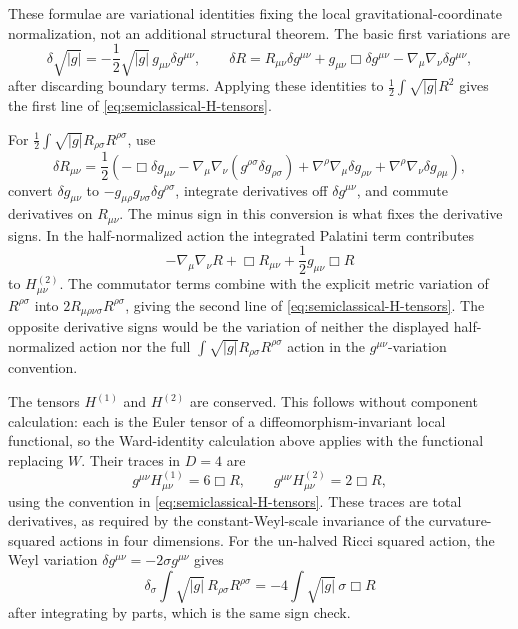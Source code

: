 These formulae are variational identities fixing the local
gravitational-coordinate normalization, not an additional structural theorem.
The basic first variations are
\begin{equation}
  \delta\sqrt{|g|}
  =
  -\frac12\sqrt{|g|}\,g_{\mu\nu}\delta g^{\mu\nu},
  \qquad
  \delta R
  =
  R_{\mu\nu}\delta g^{\mu\nu}
  +
  g_{\mu\nu}\Box\delta g^{\mu\nu}
  -
  \nabla_\mu\nabla_\nu\delta g^{\mu\nu},
  \label{eq:semiclassical-basic-metric-variations}
\end{equation}
after discarding boundary terms.  Applying these identities to
\(\frac12\int\sqrt{|g|}R^2\) gives the first line of
\eqref{eq:semiclassical-H-tensors}.

For \(\frac12\int\sqrt{|g|}R_{\rho\sigma}R^{\rho\sigma}\), use
\begin{equation}
  \delta R_{\mu\nu}
  =
  \frac12\left(
    -\Box\delta g_{\mu\nu}
    -\nabla_\mu\nabla_\nu(g^{\rho\sigma}\delta g_{\rho\sigma})
    +
    \nabla^\rho\nabla_\mu\delta g_{\rho\nu}
    +
    \nabla^\rho\nabla_\nu\delta g_{\rho\mu}
  \right),
  \label{eq:semiclassical-ricci-variation}
\end{equation}
convert \(\delta g_{\mu\nu}\) to
\(-g_{\mu\rho}g_{\nu\sigma}\delta g^{\rho\sigma}\), integrate derivatives
off \(\delta g^{\mu\nu}\), and commute derivatives on \(R_{\mu\nu}\).  The
minus sign in this conversion is what fixes the derivative signs.  In the
half-normalized action the integrated Palatini term contributes
\[
  -\nabla_\mu\nabla_\nu R+\Box R_{\mu\nu}
  +\frac12g_{\mu\nu}\Box R
\]
to \(H^{(2)}_{\mu\nu}\).  The commutator terms combine with the explicit
metric variation of \(R^{\rho\sigma}\) into
\(2R_{\mu\rho\nu\sigma}R^{\rho\sigma}\), giving the second line of
\eqref{eq:semiclassical-H-tensors}.  The opposite derivative signs would be
the variation of neither the displayed half-normalized action nor the
full \(\int\sqrt{|g|}R_{\rho\sigma}R^{\rho\sigma}\) action in the
\(g^{\mu\nu}\)-variation convention.

The tensors \(H^{(1)}\) and \(H^{(2)}\) are conserved.  This follows without
component calculation: each is the Euler tensor of a diffeomorphism-invariant
local functional, so the Ward-identity calculation above applies with the
functional replacing \(W\).  Their traces in \(D=4\) are
\begin{equation}
  g^{\mu\nu}H^{(1)}_{\mu\nu}=6\Box R,
  \qquad
  g^{\mu\nu}H^{(2)}_{\mu\nu}=2\Box R,
  \label{eq:semiclassical-H-traces}
\end{equation}
using the convention in \eqref{eq:semiclassical-H-tensors}.  These traces
are total derivatives, as required by the constant-Weyl-scale invariance of
the curvature-squared actions in four dimensions.  For the un-halved Ricci
squared action, the Weyl variation
\(\delta g^{\mu\nu}=-2\sigma g^{\mu\nu}\) gives
\[
  \delta_\sigma
  \int\sqrt{|g|}\,R_{\rho\sigma}R^{\rho\sigma}
  =
  -4\int\sqrt{|g|}\,\sigma\Box R
\]
after integrating by parts, which is the same sign check.

